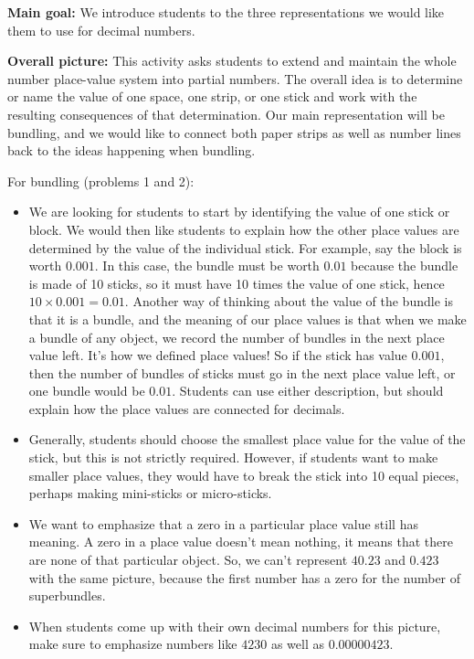 \documentclass[nooutcomes,noauthor,handout]{ximera}
\begin{document}
\begin{instructorNotes}

{\bf Main goal:} We introduce students to the three representations we would like them to use for decimal numbers. 

{\bf Overall picture:}
    This activity asks students to extend and maintain the whole number place-value system into partial numbers.  The overall idea is to determine or name the value of one space, one strip, or one stick and work with the resulting consequences of that determination. Our main representation will be bundling, and we would like to connect both paper strips as well as number lines back to the ideas happening when bundling.
    
    For bundling (problems 1 and 2):
    \begin{itemize}
    	\item We are looking for students to start by identifying the value of one stick or block. We would then like students to explain how the other place values are determined by the value of the individual stick. For example, say the block is worth $0.001$. In this case, the bundle must be worth $0.01$ because the bundle is made of 10 sticks, so it must have 10 times the value of one stick, hence $10 \times 0.001 = 0.01$. Another way of thinking about the value of the bundle is that it is a bundle, and the meaning of our place values is that when we make a bundle of any object, we record the number of bundles in the next place value left. It's how we defined place values! So if the stick has value $0.001$, then the number of bundles of sticks must go in the next place value left, or one bundle would be $0.01$. Students can use either description, but should explain how the place values are connected for decimals.
	\item Generally, students should choose the smallest place value for the value of the stick, but this is not strictly required. However, if students want to make smaller place values, they would have to break the stick into 10 equal pieces, perhaps making mini-sticks or micro-sticks.
	\item We want to emphasize that a zero in a particular place value still has meaning. A zero in a place value doesn't mean nothing, it means that there are none of that particular object. So, we can't represent $40.23$ and $0.423$ with the same picture, because the first number has a zero for the number of superbundles.
	\item When students come up with their own decimal numbers for this picture, make sure to emphasize numbers like $4230$ as well as $0.00000423$.

\end{itemize}
\end{instructorNotes}
\end{document}
